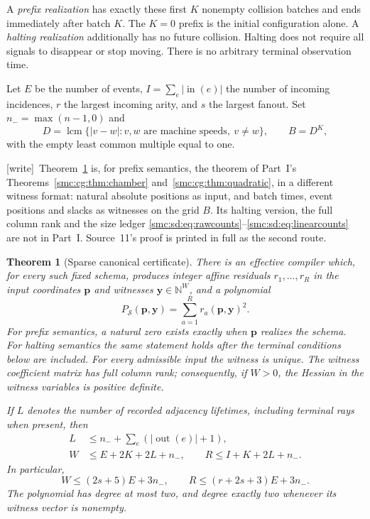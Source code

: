 \documentclass[11pt,letterpaper]{article}
\numberwithin{equation}{section}
\newtheorem{theorem}{Theorem}[section]
\theoremstyle{definition}
\theoremstyle{remark}
\newcommand{\lcm}{\operatorname{lcm}}
\newcommand{\NN}{\mathbb N}
\newcommand{\cS}{\mathcal S}
\newcommand{\out}{\operatorname{out}}
\newcommand{\inset}{\operatorname{in}}
\newcommand{\nminus}{n_{-}}
\newcommand{\wtag}{\textup{[write]}}
\begin{document}
A \emph{prefix realization} has exactly these first $K$ nonempty collision batches and ends immediately after batch $K$. The $K=0$ prefix is the initial configuration alone. A \emph{halting realization} additionally has no future collision. Halting does not require all signals to disappear or stop moving. There is no arbitrary terminal observation time.

Let $E$ be the number of events, $I=\sum_e|\inset(e)|$ the number of incoming incidences, $r$ the largest incoming arity, and $s$ the largest fanout. Set $\nminus=\max(n-1,0)$ and
\begin{equation}\label{smc:sd:eq:modulus}
 D=\lcm\{|v-w|:v,w\text{ are machine speeds},\ v\ne w\},\qquad B=D^K,
\end{equation}
with the empty least common multiple equal to one.

\noindent\wtag\ Theorem~\ref{smc:sd:thm:main} is, for prefix semantics, the theorem of Part~I's Theorems~\ref{smc:cg:thm:chamber} and~\ref{smc:cg:thm:quadratic}, in a different witness format: natural absolute positions as input, and batch times, event positions and slacks as witnesses on the grid $B$. Its halting version, the full column rank and the size ledger \eqref{smc:sd:eq:rawcounts}--\eqref{smc:sd:eq:linearcounts} are not in Part~I. Source~11's proof is printed in full as the second route.

\begin{theorem}[Sparse canonical certificate]\label{smc:sd:thm:main}
There is an effective compiler which, for every such fixed schema, produces integer affine residuals $r_1,\ldots,r_R$ in the input coordinates $\mathbf p$ and witnesses $\mathbf y\in\NN^W$, and a polynomial
\[
 P_{\cS}(\mathbf p,\mathbf y)=\sum_{a=1}^R r_a(\mathbf p,\mathbf y)^2.
\]
For prefix semantics, a natural zero exists exactly when $\mathbf p$ realizes the schema. For halting semantics the same statement holds after the terminal conditions below are included. For every admissible input the witness is unique. The witness coefficient matrix has full column rank; consequently, if $W>0$, the Hessian in the witness variables is positive definite.

If $L$ denotes the number of recorded adjacency lifetimes, including terminal rays when present, then
\begin{align}
 L&\le \nminus+\sum_e(|\out(e)|+1),\label{smc:sd:eq:Lbound}\\
 W&\le E+2K+2L+\nminus,\qquad
 R\le I+K+2L+\nminus.\label{smc:sd:eq:rawcounts}
\end{align}
In particular,
\begin{equation}\label{smc:sd:eq:linearcounts}
 W\le(2s+5)E+3\nminus,\qquad
 R\le(r+2s+3)E+3\nminus.
\end{equation}
The polynomial has degree at most two, and degree exactly two whenever its witness vector is nonempty.
\end{theorem}
\end{document}
